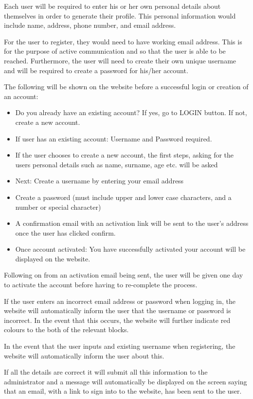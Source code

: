 \documentclass[a4paper, 12pt]{article}
\begin{document}
Each user will be required to enter his or her own personal details about themselves in order to generate their profile. 
This personal information would include name, address, phone number, and email address.

For the user to register, they would need to have working email address. This is for the purpose of active communication and so that the user is able to be reached. Furthermore, the user will need to create their own unique username and will be required to create a password for his/her account.

The following will be shown on the website before a successful login or creation of an account:

\begin{itemize}
\item Do you already have an existing account? If yes, go to LOGIN button. If not, create a new account.
\item If user has an existing account: Username and Password required.
\item If the user chooses to create a new account, the first steps, asking for the users personal details such as name, surname, age etc. will be asked
\item Next: Create a username by entering your email address
\item Create a password (must include upper and lower case characters, and a number or special character)
\item A confirmation email with an activation link will be sent to the user's address once the user has clicked confirm.
\item Once account activated: You have successfully activated your account will be displayed on the website.
\end{itemize}

Following on from an activation email being sent, the user will be given one day to activate the account before having to re-complete the process.

If the user enters an incorrect email address or password when logging in, the website will automatically inform the user that the username or password is incorrect. In the event that this occurs, the website will further indicate red colours to the both of the relevant blocks.

In the event that the user inputs and existing username when registering, the website will automatically inform the user about this. 

If all the details are correct it will submit all this information to the administrator and a message will automatically be displayed on the screen saying that an email, with a link to sign into to the website, has been sent to the user. 
\end{document}

